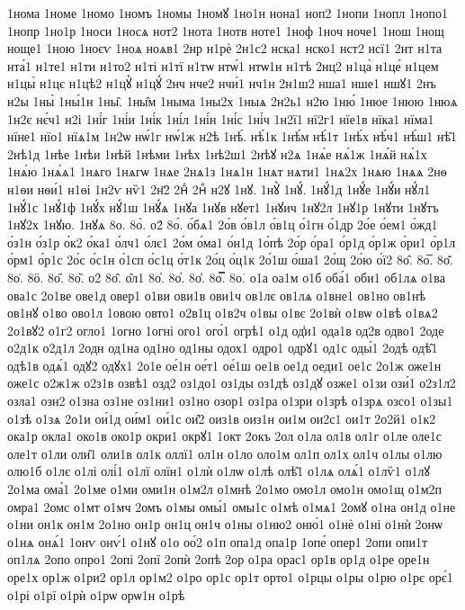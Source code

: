 {1нома
1номе
1номо
1номъ
1номы
1номꙋ
1но1н
нона1
ноп2
1нопи
1нопл
1нопо1
1нопр
1но1р
1носи
1носѧ
нот2
1нота
1нотв
ноте1
1ноф
1ноч
ноче1
1нош
1нощ
ноще1
1ною
1ноєѵ
1ноѧ
ноѧв1
2нр
н1рѐ
2н1с2
нска1
нско1
нст2
нсї1
2нт
н1та
нта́1
н1те1
н1ти
н1то2
н1ті
н1тї
н1тѡ
нтѡ́1
нтѡ1н
н1тѣ
2нц2
н1ца̀
н1це́
н1цем
н1цы̀
н1цє
н1цѣ2
н1цꙋ̀
н1цꙋ́
2нч
нче2
нчи́1
нч1н
2н1ш2
нша1
нше1
ншꙋ1
2нъ
н2ы
1ны̀
1ны́1н
1ны̑.
1ны̑м
1ныма
1ны2х
1ныѧ
2н2ь1
н2ю
1ню́
1нюе
1нюю
1нюѧ
1н2є
нє́ч1
н2і
1ні́г
1ні́и
1ні́к
1ні́л
1ні́н
1ні́с
1ні́ч
1н2ї1
нї2г1
нїе1в
нїка1
нїма1
нїне1
нїо1
нїѧ1м
1н2ѡ
нѡ́1г
нѡ́1ж
н2ѣ
1нѣ́.
нѣ́1к
1нѣ́м
нѣ́1т
1нѣ́х
нѣ́ч1
нѣ́ш1
нѣ̑1
2нѣ1д
1нѣе
1нѣи
1нѣй
1нѣми
1нѣх
1нѣ2ш1
2нѣꙋ
н2ѧ
1нѧ́е
нѧ́1ж
1нѧ́й
нѧ́1х
1нѧ́ю
1нѧ́ѧ1
1нѧго
1нѧгѡ
1нѧе
2нѧ1з
1нѧ1н
1нѧт
нѧти1
1нѧ2х
1нѧю
1нѧѧ
2нѳ
н1ѳи
нѳи́1
н1ѳі
1н2ѵ
нѷ1
2н҃2
2нⷣ
2нⷴ
н2ꙋ
1нꙋ.
1нꙋ̀
1нꙋ́.
1нꙋ́1д
1нꙋ́е
1нꙋ́и
нꙋ́л1
1нꙋ́1с
1нꙋ́1ф
1нꙋ́х
нꙋ́1ш
1нꙋ́ѧ
1нꙋа
1нꙋв
нꙋет1
1нꙋич
1нꙋ2л
1нꙋ1р
1нꙋти
1нꙋтъ
1нꙋ2х
1нꙋю.
1нꙋѧ
8о.
8о̀.
о2́
8о́.
о́бѧ1
2о́в
о́в1л
о́в1ц
о́1гн
о́1др
2о́е
о́ем1
о́жд1
о́з1н
о́з1р
о́к2
о́ка1
о́лч1
о́лє1
2о́м
о́ма1
о́н1д
1о́пѣ
2о́р
о́ра1
о́р1д
о́р1ж
о́ри1
о́р1л
о́рм1
о́р1с
2о́с
о́с1н
о́1сп
о́с1ц
о́т1к
2о́ц
о́ц1к
2о́1ш
о́ша1
2о́щ
2о́ю
о́ї2
8о̂.
8о̅.
8о̆.
8о̇.
8ӧ.
8о̋.
8о̏.
о2̑
8о̑.
о̑л1
8о̓.
8о̔.
8о̾.
8о̿.
8о͘.
о1а
оа1м
о1б
оба́1
оби1
об1лѧ
о1ва
ова1с
2о1ве
ове1д
овер1
о1ви
ови1в
ови1ч
ов1лє
ов1лѧ
о1вне1
ов1но
ов1нѣ
ов1нꙋ
о1во
ово1л
1овою
овто1
о2в1ц
о1в2ч
о1вы
о1вє
2о1вѝ
о1вѡ
о1вѣ
о1вѧ2
2о1вꙋ2
о1г2
огло1
1огно
1огні
ого1
ого́1
огрѣ1
о1д
од̾и1
ода1в
од2в
одво1
2оде
о2д1к
о2д1л
2одн
од1на
од1но
од1ны
одох1
одро1
одрꙋ1
од1с
оды́1
2одѣ
одѣ̑1
одѣ1в
одѧ́1
одꙋ2
одꙋх1
2о1е
ое́1н
ое́т1
ое́1ш
ое1в
ое1д
оеди1
ое1с
2о1ж
оже1н
оже1с
о2ж1ж
о2з1в
озвѣ1
озд2
оз1до1
оз1ды
оз1дѣ
оз1дꙋ
озже1
о1зи
ози́1
о2з1л2
озла1
озн2
о1зна
оз1не
оз1ни1
оз1но
озор1
оз1ра
о1зри
о1зрѣ
о1зрѧ
озсо1
о1зы1
о1зѣ
о1зѧ
2о1и
ои́1д
ои́м1
ои́1с
ои̑2
оиз1в
оиз1н
ои1м
ои2с1
ои1т
2о2й1
о1к2
ока1р
окла1
око1в
око1р
окри1
окрꙋ1
1окт
2окъ
2ол
о1ла
ол1в
ол1г
о1ле
оле1с
оле1т
о1ли
оли̑1
оли1в
ол1к
оллї1
ол1н
о1ло
оло1м
ол1п
ол1х
ол1ч
о1лы
о1лю
олю1б
о1лє
о1лі
олі́1
о1лї
олїн1
о1лѝ
о1лѡ
о1лѣ
олѣ̑1
о1лѧ
олѧ́1
о1лѷ1
о1лꙋ
2о1ма
ома́1
2о1ме
о1ми
оми1н
о1м2л
о1мнѣ
2о1мо
омо1л
омо1н
омо1щ
о1м2п
омра1
2омс
о1мт
о1мч
2омъ
о1мы
омы́1
омы1с
о1мѣ
о1мѧ1
2омꙋ
о1на
он1д
о1не
о1ни
он1к
он1м
2о1но
он1р
он1ц
он1ч
о1ны
о1ню2
оню́1
о1нѐ
о1ні
о1нѝ
2онѡ
о1нѧ
онѧ́1
1онѵ
онѵ́1
о1нꙋ
о1о
оо́2
о1п
опа1д
опа1р
1опе́
опер1
2опи
опи1т
оп1лѧ
2опо
опро1
2опі
2опї
2опѝ
2опѣ
2ор
о1ра
орас1
ор1в
ор1д
о1ре
оре1н
оре1х
ор1ж
о1ри2
ор1л
ор1м2
о1ро
ор1с
ор1т
орто1
о1рцы
о1ры
о1рю
о1рє
орє́1
о1рі
о1рї
о1рѝ
о1рѡ
орѡ1н
о1рѣ
}
